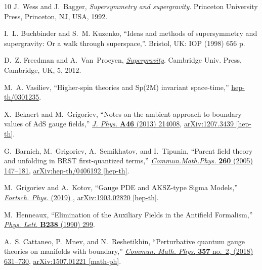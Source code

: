 \documentclass[a4paper,12pt]{article}
\numberwithin{equation}{section} %
\numberwithin{equation}{section}
\begin{document}
\begin{thebibliography}{10}
J.~Wess and J.~Bagger, {\em {Supersymmetry and supergravity}}.
\newblock Princeton University Press, Princeton, NJ, USA, 1992.

I.~L. Buchbinder and S.~M. Kuzenko, ``{I}deas and methods of supersymmetry and supergravity: {O}r a walk through superspace,''. Bristol, UK: IOP (1998) 656 p.

D.~Z. Freedman and A.~Van~Proeyen, \href{http://dx.doi.org/10.1017/CBO9781139026833}{{\em {Supergravity}}}.
\newblock Cambridge Univ. Press, Cambridge, UK, 5, 2012.

M.~A. Vasiliev, ``{H}igher-spin theories and {Sp(2M)} invariant space-time,''
\href{http://arxiv.org/abs/hep-th/0301235}{{\ttfamily hep-th/0301235}}.

X.~Bekaert and M.~Grigoriev, ``{Notes on the ambient approach to boundary values of AdS gauge fields},'' \href{http://dx.doi.org/10.1088/1751-8113/46/21/214008}{{\em J. Phys.} {\bfseries A46} (2013) 214008},
\href{http://arxiv.org/abs/1207.3439}{{\ttfamily arXiv:1207.3439 [hep-th]}}.

G.~Barnich, M.~Grigoriev, A.~Semikhatov, and I.~Tipunin, ``{P}arent field theory and unfolding in {BRST} first-quantized terms,'' \href{http://dx.doi.org/10.1007/s00220-005-1408-4}{{\em Commun.Math.Phys.} {\bfseries 260} (2005) 147--181},
\href{http://arxiv.org/abs/hep-th/0406192}{{\ttfamily arXiv:hep-th/0406192 [hep-th]}}.

M.~Grigoriev and A.~Kotov, ``{Gauge PDE and AKSZ-type Sigma Models},'' \href{http://dx.doi.org/10.1002/1521-3978(200209)50:8/9<825::AID-PROP825>3.0.CO;2-V}{{\em Fortsch. Phys.} (2019) }, \href{http://arxiv.org/abs/1903.02820}{{\ttfamily arXiv:1903.02820 [hep-th]}}.

M.~Henneaux, ``{Elimination of the Auxiliary Fields in the Antifield Formalism},''
\href{http://dx.doi.org/10.1016/0370-2693(90)91739-X}{{\em Phys. Lett.} {\bfseries B238} (1990) 299}.

A.~S. Cattaneo, P.~Mnev, and N.~Reshetikhin, ``{Perturbative quantum gauge theories on manifolds with boundary},'' \href{http://dx.doi.org/10.1007/s00220-017-3031-6}{{\em Commun. Math. Phys.} {\bfseries 357} no.~2, (2018) 631--730},
\href{http://arxiv.org/abs/1507.01221}{{\ttfamily arXiv:1507.01221 [math-ph]}}.


\end{thebibliography}
\end{document}
